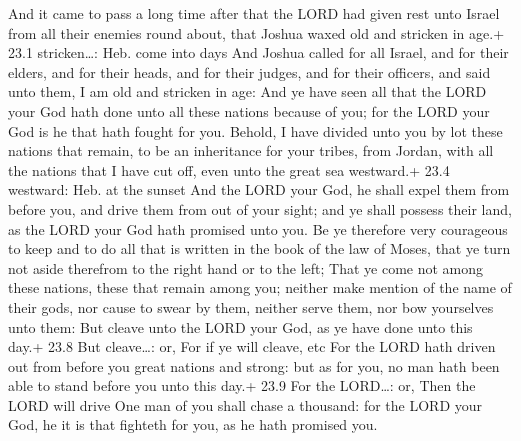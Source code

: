  And it came to pass a long time after that the LORD had
given rest unto Israel from all their enemies round about, that Joshua
waxed old and stricken in age.+ 23.1 stricken\ldots: Heb. come into days
 And Joshua called for all Israel, and for their elders, and
for their heads, and for their judges, and for their officers, and said
unto them, I am old and stricken in age:  And ye have seen
all that the LORD your God hath done unto all these nations because of
you; for the LORD your God is he that hath fought for you. 
Behold, I have divided unto you by lot these nations that remain, to be
an inheritance for your tribes, from Jordan, with all the nations that I
have cut off, even unto the great sea westward.+ 23.4 westward: Heb. at
the sunset  And the LORD your God, he shall expel them from
before you, and drive them from out of your sight; and ye shall possess
their land, as the LORD your God hath promised unto you.  Be
ye therefore very courageous to keep and to do all that is written in
the book of the law of Moses, that ye turn not aside therefrom to the
right hand or to the left;  That ye come not among these
nations, these that remain among you; neither make mention of the name
of their gods, nor cause to swear by them, neither serve them, nor bow
yourselves unto them:  But cleave unto the LORD your God, as
ye have done unto this day.+ 23.8 But cleave\ldots: or, For if ye will
cleave, etc  For the LORD hath driven out from before you
great nations and strong: but as for you, no man hath been able to stand
before you unto this day.+ 23.9 For the LORD\ldots: or, Then the LORD
will drive  One man of you shall chase a thousand: for the
LORD your God, he it is that fighteth for you, as he hath promised you.

